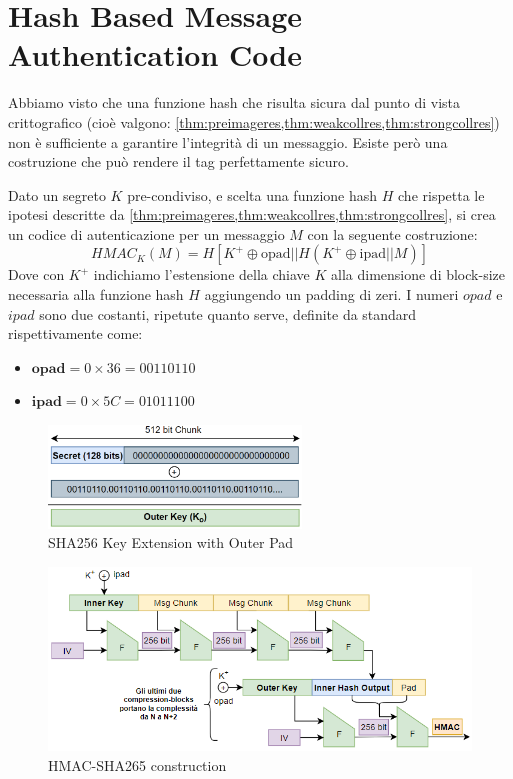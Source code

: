 \section{Hash Based Message Authentication Code}
Abbiamo visto che una funzione hash che risulta sicura dal punto di vista crittografico (cioè valgono: \cref{thm:preimageres,thm:weakcollres,thm:strongcollres}) non è sufficiente a garantire l'integrità di un messaggio. Esiste però una costruzione che può rendere il tag perfettamente sicuro. 
\begin{definition}\label{def:hmac}
Dato un segreto $K$ pre-condiviso, e scelta una funzione hash $H$ che rispetta le ipotesi descritte da \cref{thm:preimageres,thm:weakcollres,thm:strongcollres}, si crea un codice di autenticazione per un messaggio $M$ con la seguente costruzione:
\begin{equation}\label{eq:hmac}
HMAC_K(M)=H[K^+\oplus{\text{opad}}||H(K^+\oplus{\text{ipad}}||M)]
\end{equation}
Dove con $K^+$ indichiamo l'estensione della chiave $K$ alla dimensione di block-size necessaria alla funzione hash $H$ aggiungendo un padding di zeri. I numeri $opad$ e $ipad$ sono due costanti, ripetute quanto serve, definite da standard rispettivamente come:
\begin{itemize}
    \item $\textbf{opad}=0\times36=00110110$
    \item $\textbf{ipad}=0\times5C=01011100$
\end{itemize}
\end{definition}
\begin{figure}[h]
    \centering
    \includegraphics[width=0.6\textwidth]{image/hmackplus.png}
    \caption{SHA256 Key Extension with Outer Pad}
    \label{fig:hmackplus}
\end{figure}
\begin{figure}[h]
    \centering
    \includegraphics{image/hmac.png}
    \caption{HMAC-SHA265 construction}
    \label{fig:hmacsha256}
\end{figure}
